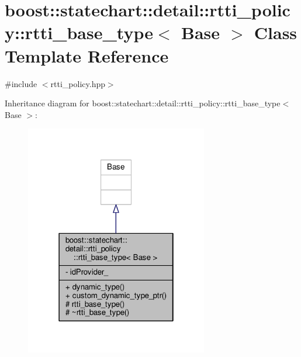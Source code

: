 \hypertarget{classboost_1_1statechart_1_1detail_1_1rtti__policy_1_1rtti__base__type}{}\section{boost\+:\+:statechart\+:\+:detail\+:\+:rtti\+\_\+policy\+:\+:rtti\+\_\+base\+\_\+type$<$ Base $>$ Class Template Reference}
\label{classboost_1_1statechart_1_1detail_1_1rtti__policy_1_1rtti__base__type}


{\ttfamily \#include $<$rtti\+\_\+policy.\+hpp$>$}



Inheritance diagram for boost\+:\+:statechart\+:\+:detail\+:\+:rtti\+\_\+policy\+:\+:rtti\+\_\+base\+\_\+type$<$ Base $>$\+:
\nopagebreak
\begin{figure}[H]
\begin{center}
\leavevmode
\includegraphics[width=226pt]{classboost_1_1statechart_1_1detail_1_1rtti__policy_1_1rtti__base__type__inherit__graph}
\end{center}
\end{figure}



